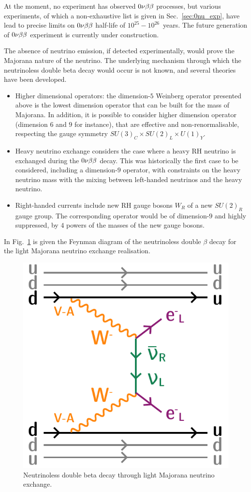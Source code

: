 At the moment, no experiment has observed $0\nu\beta\beta$ processes, but various experiments, of which a non-exhaustive list is given in Sec.~\ref{sec:0nu_exp}, have lead to precise limits on $0\nu\beta\beta$ half-life of $10^{25}-10^{26}$~years.
The future generation of $0\nu\beta\beta$ experiment is currently under construction.

The absence of neutrino emission, if detected experimentally, would prove the Majorana nature of the neutrino.
The underlying mechanism through which the neutrinoless double beta decay would occur is not known, and several theories have been developed.
\begin{itemize}
\item Higher dimensional operators: the dimension-$5$ Weinberg operator presented above is the lowest dimension operator that can be built for the mass of Majorana.
  In addition, it is possible to consider higher dimension operator (dimension $6$ and $9$ for instance), that are effective and non-renormalisable, respecting the gauge symmetry ${SU(3)_C\times SU(2)_L\times U(1)_Y}$.
\item Heavy neutrino exchange considers the case where a heavy RH neutrino is exchanged during the $0\nu\beta\beta$ decay.
  This was historically the first case to be considered, including a dimension-$9$ operator, with constraints on the heavy neutrino mass with the mixing between left-handed neutrinos and the heavy neutrino.
\item Right-handed currents include new RH gauge bosons $W_R$ of a new $SU(2)_R$ gauge group.
  The corresponding operator would be of dimension-$9$ and highly suppressed, by $4$ powers of the masses of the new gauge bosons.
\end{itemize}
In Fig.~\ref{fig:0nu_diagram} is given the Feynman diagram of the neutrinoless double $\beta$ decay for the light Majorana neutrino exchange realisation.

\begin{figure}[h!]
  \centering
    \includegraphics[height=0.4\textwidth]{neutrinophysics/fig_neutrinophysics/0nubb_diagram.pdf}
  \caption{Neutrinoless double beta decay through light Majorana neutrino exchange.
    \label{fig:0nu_diagram}}
\end{figure}

